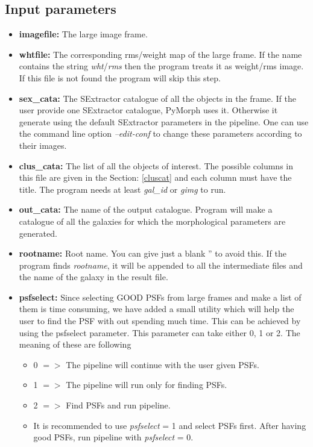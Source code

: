 \documentclass[a4paper,10pt]{article}
\begin{document}
\subsection{Input parameters}
\label{inputp}
\begin{itemize}
\item \textbf{imagefile:} The large image frame.%

\item \textbf{whtfile:} The corresponding rms/weight map of the large frame. If the name contains the string \textit{wht}/\textit{rms} then the program treats it as weight/rms image. If this file is not found the program will skip this step. 

\item \textbf{sex\_cata:} The SExtractor catalogue of all the objects in the frame. If the user provide one SExtractor catalogue, PyMorph uses it. Otherwise it generate using the default SExtractor parameters in the pipeline. One can use the command line option \textit{--edit-conf} to change these parameters according to their images.

\item \textbf{clus\_cata:} The list of all the objects of interest. The possible columns in this file are given in the Section: \ref{cluscat} and each column must have the title. The program needs at least \textit{gal\_id} or \textit{gimg} to run.

\item \textbf{out\_cata:} The name of the output catalogue. Program will make a catalogue of all the galaxies for which the morphological parameters are generated.

\item \textbf{rootname:} Root name. You can give just a blank '' to avoid this. If the program finds \textit{rootname}, it will be appended to all the intermediate files and the name of the galaxy in the result file.

\item \textbf{psfselect:} Since selecting GOOD PSFs from large frames and make a list of them is time consuming, we have added a small utility which will help the user to find the PSF with out spending much time. This can be achieved by using the psfselect parameter. This parameter can take either 0, 1 or 2. The meaning of these are following
\begin{itemize}
\item 0 $=>$ The pipeline will continue with the user given PSFs.
\item 1 $=>$ The pipeline will run only for finding PSFs.
\item 2 $=>$ Find PSFs and run pipeline.
\item[] It is recommended to use \textit{psfselect} = 1 and select PSFs first. After having
 good PSFs, run pipeline with \textit{psfselect} = 0.
\end{itemize}


\end{itemize}
\end{document}
